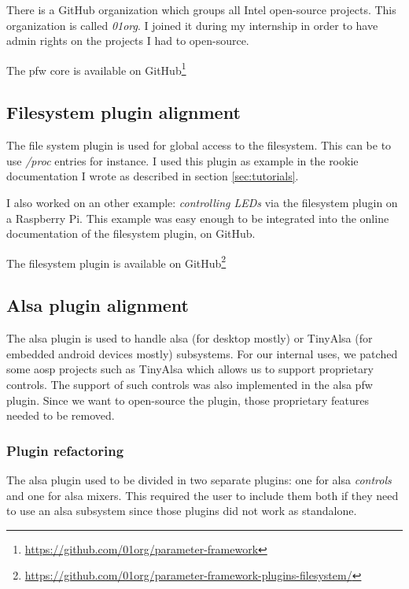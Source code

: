 There is a \gls{GitHub} organization which groups all Intel open-source projects. This
organization is called \emph{01org}. I joined it during my internship in order to have admin rights
on the projects I had to open-source.

The \gls{pfw} core is available on \gls{GitHub}\footnote{\url{https://github.com/01org/parameter-framework}}

\subsection{Filesystem plugin alignment}

The file system plugin is used for global access to the filesystem. This can be to
use \emph{/proc} entries for instance. I used this plugin as example in the rookie
documentation I wrote as described in section \ref{sec:tutorials}.

I also worked on an other example: \emph{controlling LEDs} via the filesystem
plugin on a Raspberry Pi.  This example was easy enough to be integrated into
the online documentation of the filesystem plugin, on \gls{GitHub}.

The filesystem plugin is available on \gls{GitHub}\footnote{\url{https://github.com/01org/parameter-framework-plugins-filesystem/}}

\subsection{Alsa plugin alignment}

The \gls{alsa} plugin is used to handle \gls{alsa} (for desktop mostly) or TinyAlsa (for embedded \gls{android} devices mostly) subsystems.
For our internal uses, we patched some \gls{aosp} projects such as TinyAlsa which allows us to support proprietary controls.
The support of such controls was also implemented in the \gls{alsa} \gls{pfw} plugin. Since
we want to open-source the plugin, those proprietary features needed to be removed.

\subsubsection{Plugin refactoring}
The \gls{alsa} plugin used to be divided in two separate plugins: one for \gls{alsa} \emph{controls} and one for \gls{alsa} mixers.
This required the user to include them both if they need to use an \gls{alsa} subsystem since those plugins did not work as
standalone.

